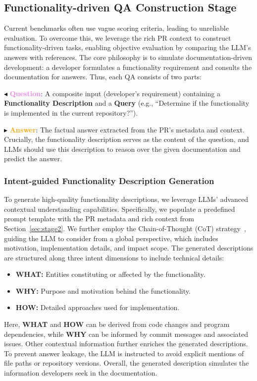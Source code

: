 \subsection{Functionality-driven QA Construction Stage}

Current benchmarks often use vague scoring criteria, leading to unreliable evaluation. To overcome this, we leverage the rich PR context to construct functionality-driven tasks, enabling objective evaluation by comparing the LLM's answers with references. The core philosophy is to simulate documentation-driven development: a developer formulates a functionality requirement and consults the documentation for answers. Thus, each QA consists of two parts: 

\noindent \textbf{$\blacktriangleleft$} \textbf{\textcolor{violet}{Question}}: A composite input (developer's requirement) containing a \textbf{Functionality Description} and a \textbf{Query} (e.g., ``Determine if the functionality is implemented in the current repository?'').

\noindent \textbf{$\blacktriangleright$} \textbf{\textcolor{orange}{Answer}}: The factual answer extracted from the PR's metadata and context. Crucially, the functionality description serves as the content of the question, and LLMs should use this description to reason over the given documentation and predict the answer.

\subsubsection{Intent-guided Functionality Description Generation}
To generate high-quality functionality descriptions, we leverage LLMs' advanced contextual understanding capabilities. Specifically, we populate a predefined prompt template with the PR metadata and rich context from Section~\ref{sec:stage2}. We further employ the Chain-of-Thought (CoT) strategy~\cite{chain}, guiding the LLM to consider from a global perspective, which includes motivation, implementation details, and impact scope. The generated descriptions are structured along three intent dimensions to include technical details:
\begin{itemize}[leftmargin=*]
    \item \textbf{WHAT:} Entities constituting or affected by the functionality.
    \item \textbf{WHY:} Purpose and motivation behind the functionality.
    \item \textbf{HOW:} Detailed approaches used for implementation.
\end{itemize}
Here, \textbf{WHAT} and \textbf{HOW} can be derived from code changes and program dependencies, while \textbf{WHY} can be informed by commit messages and associated issues. Other contextual information further enriches the generated descriptions. 
To prevent answer leakage, the LLM is instructed to avoid explicit mentions of file paths or repository versions. Overall, the generated description simulates the information developers seek in the documentation.

